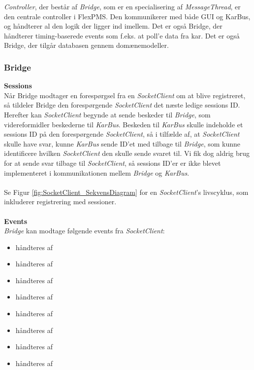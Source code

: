 \textit{Controller}, der består af \textit{Bridge}, som er en specialisering af \textit{MessageThread}, er den centrale controller i FlexPMS. Den kommunikerer med både GUI og KarBus, og håndterer al den logik der ligger ind imellem. Det er også Bridge, der håndterer timing-baserede events som f.eks. at poll'e data fra kar. Det er også Bridge, der tilgår databasen gennem domænemodeller.


\subsubsection{Bridge}


\textbf{Sessions}\\
Når Bridge modtager en forespørgsel fra en \textit{SocketClient} om at blive registreret, så tildeler Bridge den forespørgende \textit{SocketClient} det næste ledige sessions ID. Herefter kan \textit{SocketClient} begynde at sende beskeder til \textit{Bridge}, som videreformidler beskederne til \textit{KarBus}. Beskeden til \textit{KarBus} skulle indeholde et sessions ID på den forespørgende \textit{SocketClient}, så i tilfælde af, at \textit{SocketClient} skulle have svar, kunne \textit{KarBus} sende ID'et med tilbage til \textit{Bridge}, som kunne identificere hvilken \textit{SocketClient} den skulle sende svaret til. Vi fik dog aldrig brug for at sende svar tilbage til \textit{SocketClient}, så sessions ID'er er ikke blevet implementeret i kommunikationen mellem \textit{Bridge} og \textit{KarBus}.\\\\

Se Figur \ref{fig:SocketClient_SekvensDiagram} for en \textit{SocketClient}'s livscyklus, som inkluderer registrering med sessioner.\\\\

\textbf{Events}\\

\textit{Bridge} kan modtage følgende events fra \textit{SocketClient}:

\begin{itemize}
\item {} håndteres af 
\item {} håndteres af 
\item {} håndteres af 
\item {} håndteres af 
\item {} håndteres af 
\item {} håndteres af 
\item {} håndteres af 
\item {} håndteres af 
\end{itemize}

